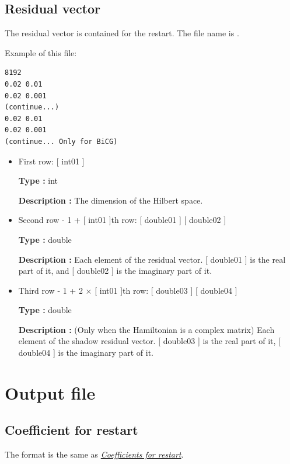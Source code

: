 \documentclass[letterpaper,10pt,dvipdfmx,openany]{sphinxmanual}
\begin{document}
\subsection{Residual vector}
\label{shiftk_format_en:residual-vector}\label{shiftk_format_en:revec}
The residual vector is contained for the restart.
The file name is .

Example of this file:

\begin{Verbatim}[commandchars=\\\{\}]
8192
0.02 0.01
0.02 0.001
(continue...)
0.02 0.01
0.02 0.001
(continue... Only for BiCG)
\end{Verbatim}
\begin{itemize}
\item {} 
First row: {[} int01 {]}

\textbf{Type :} int

\textbf{Description :} The dimension of the Hilbert space.

\item {} 
Second row - 1 + {[} int01 {]}th row:
{[} double01 {]} {[} double02 {]}

\textbf{Type :} double

\textbf{Description :} Each element of the residual vector.
{[} double01 {]} is the real part of it, and
{[} double02 {]} is the imaginary part of it.

\item {} 
Third row - 1 + 2 \(\times\) {[} int01 {]}th row:
{[} double03 {]} {[} double04 {]}

\textbf{Type :} double

\textbf{Description :}
(Only when the Hamiltonian is a complex matrix)
Each element of the shadow residual vector.
{[} double03 {]} is the real part of it,
{[} double04 {]} is the imaginary part of it.

\end{itemize}


\section{Output file}
\label{shiftk_format_en:output-file}

\subsection{Coefficient for restart}
\label{shiftk_format_en:coefficient-for-restart}
The format is the same as {\hyperref[shiftk_format_en:recoeff]{\emph{Coefficients for restart}}}.
\end{document}
